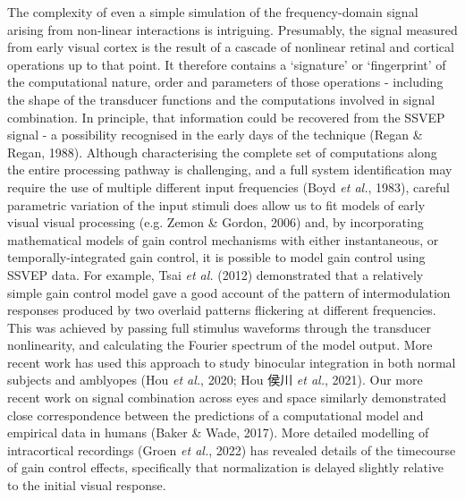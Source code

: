 \documentclass[
  letterpaper,
  DIV=11,
  numbers=noendperiod]{scrartcl}
\begin{document}
The complexity of even a simple simulation of the frequency-domain
signal arising from non-linear interactions is intriguing. Presumably,
the signal measured from early visual cortex is the result of a cascade
of nonlinear retinal and cortical operations up to that point. It
therefore contains a `signature' or `fingerprint' of the computational
nature, order and parameters of those operations - including the shape
of the transducer functions and the computations involved in signal
combination. In principle, that information could be recovered from the
SSVEP signal - a possibility recognised in the early days of the
technique (Regan \& Regan, 1988). Although characterising the complete
set of computations along the entire processing pathway is challenging,
and a full system identification may require the use of multiple
different input frequencies (Boyd \emph{et al.}, 1983), careful
parametric variation of the input stimuli does allow us to fit models of
early visual visual processing (e.g. Zemon \& Gordon, 2006) and, by
incorporating mathematical models of gain control mechanisms with either
instantaneous, or temporally-integrated gain control, it is possible to
model gain control using SSVEP data. For example, Tsai \emph{et al.}
(2012) demonstrated that a relatively simple gain control model gave a
good account of the pattern of intermodulation responses produced by two
overlaid patterns flickering at different frequencies. This was achieved
by passing full stimulus waveforms through the transducer nonlinearity,
and calculating the Fourier spectrum of the model output. More recent
work has used this approach to study binocular integration in both
normal subjects and amblyopes (Hou \emph{et al.}, 2020; Hou 侯川
\emph{et al.}, 2021). Our more recent work on signal combination across
eyes and space similarly demonstrated close correspondence between the
predictions of a computational model and empirical data in humans (Baker
\& Wade, 2017). More detailed modelling of intracortical recordings
(Groen \emph{et al.}, 2022) has revealed details of the timecourse of
gain control effects, specifically that normalization is delayed
slightly relative to the initial visual response.
\end{document}
